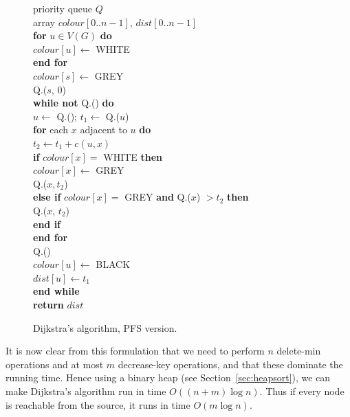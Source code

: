 \begin{figure}
{
\> priority queue $Q$ \\
\> array $colour[0..n-1]$, $dist[0..n-1]$ \\
\> \textbf{for} $u\in V(G)$ \textbf{do} \\
\> \> $colour[u] \gets$ WHITE  \\
\> \textbf{end for} \\
\> $colour[s] \gets $ GREY \\
\> Q.($s$, $0$) \\
\> \textbf{while not} Q.() \textbf{do} \\
\> \> $u \gets $ Q.(); $t_1 \gets$  Q.($u$) \\
\> \> \textbf{for} each $x$ adjacent to $u$ \textbf{do} \\
\> \> \> $t_2 \gets t_1 + c(u, x)$ \\
\> \> \>  \textbf{if} $colour[x] = $ WHITE \textbf{then} \\
\> \> \> \> $colour[x] \gets $ GREY \\
\> \> \> \> Q.($x, t_2$) \\
\> \> \> \textbf{else if} $colour[x] = $ GREY \textbf{and} Q.($x$) $ > t_2$ \textbf{then} \\
\> \> \> \> Q.($x$, $t_2$) \\
\> \> \> \textbf{end if} \\
\> \> \textbf{end for} \\
\> \> Q.() \\
\> \> $colour[u] \gets $ BLACK \\
\> \> $dist[u] \gets t_1$ \\
\> \textbf{end while} \\
\> \textbf{return} $dist$\\
}
\caption{Dijkstra's algorithm, PFS version.}
\label{fig:dijkstra-alg2}
\end{figure}


It is now clear from this formulation that we need to perform $n$
delete-min operations and at most $m$ decrease-key operations, and
that these dominate the running time. Hence using a binary heap (see
Section~\ref{sec:heapsort}), we can make Dijkstra's
algorithm run in time $O((n + m) \log n)$. Thus if every node is reachable 
from the source, it runs in time $O(m\log n)$.

